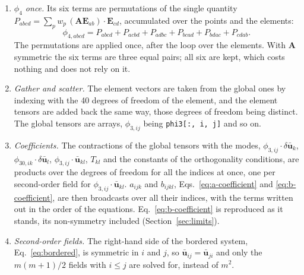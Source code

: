 \documentclass[11pt,a4paper]{article}
\begin{document}
\begin{enumerate}
        conditions is the first term of $\phi_{30}$ and is computed once for
        both.
  \item \emph{$\phi_4$ once.}  Its six terms are permutations of the single
        quantity
        $P_{abcd} = \sum_{p} w_p\,(\boldsymbol{A}\boldsymbol{E}_{ab})\cdot
        \boldsymbol{E}_{cd}$, accumulated over the points and the elements:
        \[
        \phi_{4,abcd} = P_{abcd} + P_{acbd} + P_{adbc} + P_{bcad}
                      + P_{bdac} + P_{cdab}.
        \]
        The permutations are applied once, after the loop over the elements.
        With $\boldsymbol{A}$ symmetric the six terms are three equal pairs;
        all six are kept, which costs nothing and does not rely on it.
  \item \emph{Gather and scatter.}  The element vectors are taken from the
        global ones by indexing with the 40 degrees of freedom of the
        element, and the element tensors are added back the same way, those
        degrees of freedom being distinct.  The global tensors are arrays,
        $\phi_{3,ij}$ being \texttt{phi3[:, i, j]} and so on.
  \item \emph{Coefficients.}  The contractions of the global tensors with
        the modes, $\phi_{3,ij}\cdot\delta\boldsymbol{\bar{u}}_k$,
        $\phi_{30,ik}\cdot\delta\boldsymbol{\bar{u}}_l$,
        $\phi_{3,ij}\cdot\boldsymbol{\bar{u}}_{kl}$, $T_{kl}$ and the
        constants of the orthogonality conditions, are products over the
        degrees of freedom for all the indices at once, one per second-order
        field for $\phi_{3,ij}\cdot\boldsymbol{\bar{u}}_{kl}$.  $a_{ijk}$ and $b_{ijkl}$,
        Eqs.~\ref{eq:a-coefficient} and \ref{eq:b-coefficient}, are then
        broadcasts over all their indices, with the terms written out in the
        order of the equations.  Eq.~\ref{eq:b-coefficient} is reproduced as
        it stands, its non-symmetry included (Section~\ref{sec:limits}).
  \item \emph{Second-order fields.}  The right-hand side of the bordered
        system, Eq.~\ref{eq:bordered}, is symmetric in $i$ and $j$, so
        $\boldsymbol{\bar{u}}_{ij} = \boldsymbol{\bar{u}}_{ji}$ and only the
        $m(m+1)/2$ fields with $i \le j$ are solved for, instead of $m^2$.
\end{enumerate}
\end{document}
